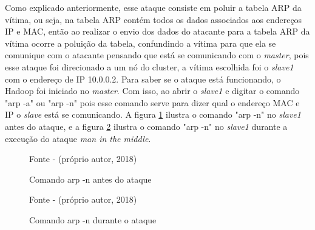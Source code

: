 
Como explicado anteriormente, esse ataque consiste em poluir a tabela ARP da vítima, ou seja, na tabela ARP contém todos os dados associados aos endereços IP e MAC, então ao realizar o envio dos dados do atacante para a tabela ARP da vítima ocorre a poluição da tabela, confundindo a vítima para que ela se comunique com o atacante pensando que está se comunicando com o \textit{master}, pois esse ataque foi direcionado a um nó do cluster, a vítima escolhida foi o \textit{slave1} com o endereço de IP 10.0.0.2. Para saber se o ataque está funcionando, o Hadoop foi iniciado no \textit{master}. Com isso, ao abrir o \textit{slave1} e digitar o comando "arp -a" ou "arp -n" pois esse comando serve para dizer qual o endereço MAC e IP o \textit{slave} está se comunicando. A figura \ref{Fig:Comando arp -n antes do ataque} ilustra o comando "arp -n" no \textit{slave1} antes do ataque, e a figura \ref{Fig:Comando arp -n durante o ataque} ilustra o comando "arp -n" no \textit{slave1} durante a execução do ataque \textit{man in the middle}.
%
\begin{figure}[htbp!] \begin{center}
\caption{Comando arp -n antes do ataque}
\small{Fonte - (próprio autor, 2018)}
\label{Fig:Comando arp -n antes do ataque}
\end{center} \end{figure}


\begin{figure}[htbp!] \begin{center}
\caption{Comando arp -n durante o ataque}
\small{Fonte - (próprio autor, 2018)}
\label{Fig:Comando arp -n durante o ataque}
\end{center} \end{figure}


